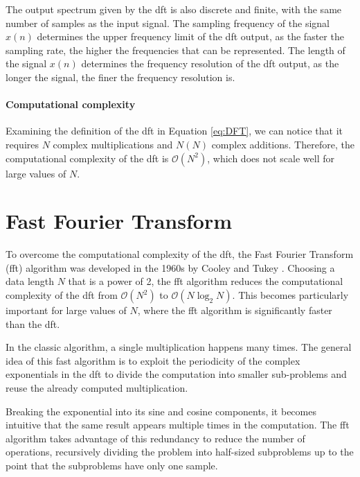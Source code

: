 The output spectrum given by the \gls{dft} is also discrete and finite, with the same number of samples as the input signal. 
The sampling frequency of the signal $x(n)$ determines the upper frequency limit of the \gls{dft} output, as the faster the sampling rate, the higher the frequencies that can be represented. The length of the signal $x(n)$ determines the frequency resolution of the \gls{dft} output, as the longer the signal, the finer the frequency resolution is.

\paragraph{Computational complexity}
Examining the definition of the \gls{dft} in Equation \ref{eq:DFT}, we can notice that it requires $N$ complex multiplications and $N(N)$ complex additions. Therefore, the computational complexity of the \gls{dft} is $\mathcal{O}(N^2)$, which does not scale well for large values of $N$.

\section{Fast Fourier Transform}
\label{sec:FastFourierTransform}

To overcome the computational complexity of the \gls{dft}, the Fast Fourier Transform (\gls{fft}) algorithm was developed in the 1960s by Cooley and Tukey \cite{cooley1965algorithm}. Choosing a data length $N$ that is a power of 2, the \gls{fft} algorithm reduces the computational complexity of the \gls{dft} from $\mathcal{O}(N^2)$ to $\mathcal{O}(N \log_2 N)$. This becomes particularly important for large values of $N$, where the \gls{fft} algorithm is significantly faster than the \gls{dft}.

In the classic algorithm, a single multiplication happens many times. The general idea of this fast algorithm is to exploit the periodicity of the complex exponentials in the \gls{dft} to divide the computation into smaller sub-problems and reuse the already computed multiplication. 

Breaking the exponential into its sine and cosine components, it becomes intuitive that the same result appears multiple times in the computation. The \gls{fft} algorithm takes advantage of this redundancy to reduce the number of operations, recursively dividing the problem into half-sized subproblems up to the point that the subproblems have only one sample.
